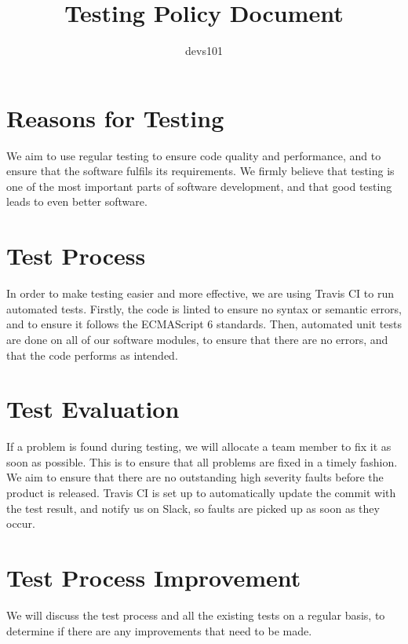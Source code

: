 \documentclass{article}
\title{Testing Policy Document}
\author{devs101}
\begin{document}
\maketitle
\newpage

\section{Reasons for Testing}
We aim to use regular testing to ensure code quality and performance, and to ensure that the software fulfils its requirements.
We firmly believe that testing is one of the most important parts of software development, and that good testing leads to even
better software.

\section{Test Process}
In order to make testing easier and more effective, we are using Travis CI to run automated tests. Firstly, the code is linted
to ensure no syntax or semantic errors, and to ensure it follows the ECMAScript 6 standards. Then, automated unit tests are done
on all of our software modules, to ensure that there are no errors, and that the code performs as intended.

\section{Test Evaluation}
If a problem is found during testing, we will allocate a team member to fix it as soon as possible. This is to ensure that all
problems are fixed in a timely fashion. We aim to ensure that there are no outstanding high severity faults before the product is released.
Travis CI is set up to automatically update the commit with the test result, and notify us on Slack, so faults are picked up as soon as
they occur.

\section{Test Process Improvement}
We will discuss the test process and all the existing tests on a regular basis, to determine if there are any improvements that need to be made.
\end{document}
